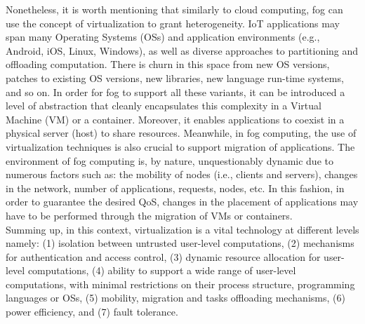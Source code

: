 \noindent\tab Nonetheless, it is worth mentioning that similarly to cloud computing, fog can use the concept of virtualization to grant heterogeneity. IoT applications may span many Operating Systems (OSs) and application environments (e.g., Android, iOS, Linux, Windows), as well as diverse approaches to partitioning and offloading computation. There is churn in this space from new OS versions, patches to existing OS versions, new libraries, new language run-time systems, and so on. In order for fog to support all these variants, it can be introduced a level of abstraction that cleanly encapsulates this complexity in a Virtual Machine (VM) or a container. Moreover, it enables applications to coexist in a physical server (host) to share resources. %
Meanwhile, in fog computing, the use of virtualization techniques is also crucial to support migration of applications. The environment of fog computing is, by nature, unquestionably dynamic due to numerous factors such as: the mobility of nodes (i.e., clients and servers), changes in the network, number of applications, requests, nodes, etc. In this fashion, in order to guarantee the desired QoS, changes in the placement of applications may have to be performed through the migration of VMs or containers.\\
\noindent\tab Summing up, in this context, virtualization is a vital technology at different levels namely: (1) isolation between untrusted user-level computations, (2) mechanisms for authentication and access control, (3) dynamic resource allocation for user-level computations, (4) ability to support a wide range of user-level computations, with minimal restrictions on their process structure, programming languages or OSs, (5) mobility, migration and tasks offloading mechanisms, (6) power efficiency, and (7) fault tolerance.\\

